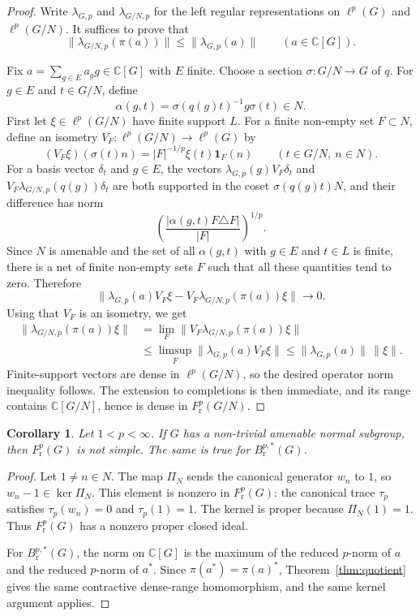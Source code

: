 \documentclass[11pt]{article}
\newtheorem{corollary}{Corollary}
\newcommand{\C}{\mathbb C}
\begin{document}
\begin{proof}
Write $\lambda_{G,p}$ and $\lambda_{G/N,p}$ for the left regular
representations on $\ell^p(G)$ and $\ell^p(G/N)$. It suffices to prove that
\[
  \|\lambda_{G/N,p}(\pi(a))\| \leq \|\lambda_{G,p}(a)\|
  \qquad (a\in \C[G]).
\]

Fix $a=\sum_{g\in E} a_g g\in\C[G]$ with $E$ finite. Choose a section
$\sigma:G/N\to G$ of $q$. For $g\in E$ and $t\in G/N$, define
\[
  \alpha(g,t)=\sigma(q(g)t)^{-1}g\sigma(t)\in N .
\]
First let $\xi\in \ell^p(G/N)$ have finite support $L$. For a finite non-empty
set $F\subset N$, define an isometry $V_F:\ell^p(G/N)\to\ell^p(G)$ by
\[
  (V_F\xi)(\sigma(t)n)= |F|^{-1/p}\xi(t)\mathbf 1_F(n)
  \qquad (t\in G/N,\ n\in N).
\]
For a basis vector $\delta_t$ and $g\in E$, the vectors
$\lambda_{G,p}(g)V_F\delta_t$ and $V_F\lambda_{G/N,p}(q(g))\delta_t$ are both
supported in the coset $\sigma(q(g)t)N$, and their difference has norm
\[
  \left(\frac{|\alpha(g,t)F\triangle F|}{|F|}\right)^{1/p}.
\]
Since $N$ is amenable and the set of all $\alpha(g,t)$ with $g\in E$ and
$t\in L$ is finite, there is a net of finite non-empty sets $F$ such that all
these quantities tend to zero. Therefore
\[
  \|\lambda_{G,p}(a)V_F\xi -
       V_F\lambda_{G/N,p}(\pi(a))\xi\| \longrightarrow 0 .
\]
Using that $V_F$ is an isometry, we get
\[
\begin{aligned}
  \|\lambda_{G/N,p}(\pi(a))\xi\|
  &= \lim_F \|V_F\lambda_{G/N,p}(\pi(a))\xi\| \\
  &\leq \limsup_F \|\lambda_{G,p}(a)V_F\xi\|
   \leq \|\lambda_{G,p}(a)\|\,\|\xi\|.
\end{aligned}
\]
Finite-support vectors are dense in $\ell^p(G/N)$, so the desired operator
norm inequality follows. The extension to completions is then immediate, and
its range contains $\C[G/N]$, hence is dense in $F^p_{\mathrm r}(G/N)$.
\end{proof}

\begin{corollary}\label{cor:obstruction}
Let $1<p<\infty$. If $G$ has a non-trivial amenable normal subgroup, then
$F^p_{\mathrm r}(G)$ is not simple. The same is true for
$B^{p,*}_{\mathrm r}(G)$.
\end{corollary}

\begin{proof}
Let $1\neq n\in N$. The map $\Pi_N$ sends the canonical generator $w_n$ to
$1$, so $w_n-1\in\ker \Pi_N$. This element is nonzero in
$F^p_{\mathrm r}(G)$: the canonical trace $\tau_p$ satisfies
$\tau_p(w_n)=0$ and $\tau_p(1)=1$. The kernel is proper because
$\Pi_N(1)=1$. Thus $F^p_{\mathrm r}(G)$ has a nonzero proper closed ideal.

For $B^{p,*}_{\mathrm r}(G)$, the norm on $\C[G]$ is the maximum of the
reduced $p$-norm of $a$ and the reduced $p$-norm of $a^*$. Since
$\pi(a^*)=\pi(a)^*$, Theorem~\ref{thm:quotient} gives the same contractive
dense-range homomorphism, and the same kernel argument applies.
\end{proof}
\end{document}
